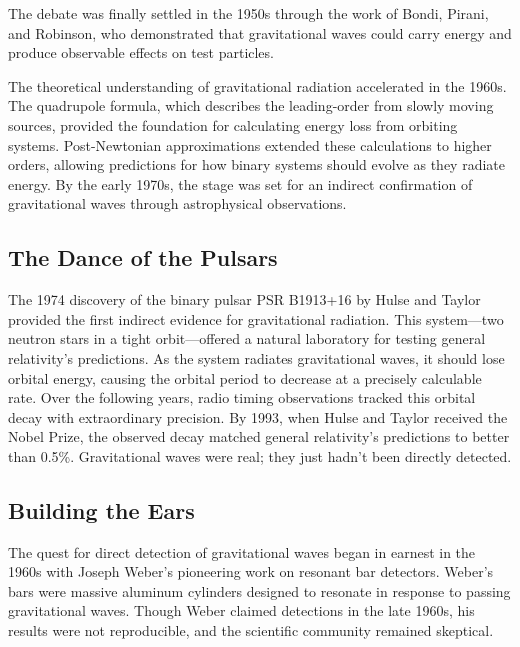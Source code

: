 The debate was finally settled in the 1950s through the work of Bondi, Pirani, and Robinson, who demonstrated that gravitational waves could carry energy and produce observable effects on test particles\cite{bondi_gravitational_1959,bondi_plane_1957,hill_how_2016}.

The theoretical understanding of gravitational radiation accelerated in the 1960s.
The quadrupole formula, which describes the leading-order from slowly moving sources, provided the foundation for calculating energy loss from orbiting systems.
Post-Newtonian approximations extended these calculations to higher orders, allowing predictions for how binary systems should evolve as they radiate energy.
By the early 1970s, the stage was set for an indirect confirmation of gravitational waves through astrophysical observations.

\subsection{The Dance of the Pulsars}\label{subsec:the-dance-of-the-pulsars}

The 1974 discovery of the binary pulsar PSR B1913+16 by Hulse and Taylor provided the first indirect evidence for gravitational radiation.
This system—two neutron stars in a tight orbit—offered a natural laboratory for testing general relativity's predictions\cite{hulse_discovery_1975}.
As the system radiates gravitational waves, it should lose orbital energy, causing the orbital period to decrease at a precisely calculable rate.
Over the following years, radio timing observations tracked this orbital decay with extraordinary precision\cite{miller_new_2019}.
By 1993, when Hulse and Taylor received the Nobel Prize, the observed decay matched general relativity's predictions to better than 0.5\%.
Gravitational waves were real; they just hadn't been directly detected\cite{damour_1974_2015}.

\subsection{Building the Ears}\label{subsec:building-the-ears}
The quest for direct detection of gravitational waves began in earnest in the 1960s with Joseph Weber's pioneering work on resonant bar detectors.
Weber's bars were massive aluminum cylinders designed to resonate in response to passing gravitational waves.
Though Weber claimed detections in the late 1960s, his results were not reproducible, and the scientific community remained skeptical\cite{weber_evidence_1969,weber_gravitational_1967}.

